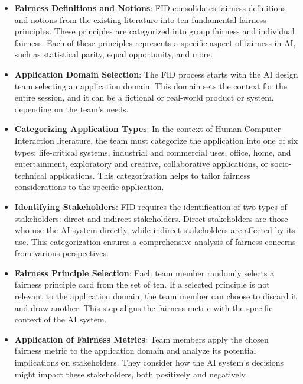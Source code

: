 \documentclass{article}
\begin{document}
\begin{itemize}
    \item \textbf{Fairness Definitions and Notions}: FID consolidates fairness definitions and notions from the existing literature into ten fundamental fairness principles. These principles are categorized into group fairness and individual fairness. Each of these principles represents a specific aspect of fairness in AI, such as statistical parity, equal opportunity, and more.
    
    \item \textbf{Application Domain Selection}: The FID process starts with the AI design team selecting an application domain. This domain sets the context for the entire session, and it can be a fictional or real-world product or system, depending on the team's needs.
    
    \item \textbf{Categorizing Application Types}: In the context of Human-Computer Interaction literature, the team must categorize the application into one of six types: life-critical systems, industrial and commercial uses, office, home, and entertainment, exploratory and creative, collaborative applications, or socio-technical applications. This categorization helps to tailor fairness considerations to the specific application.
    
    \item \textbf{Identifying Stakeholders}: FID requires the identification of two types of stakeholders: direct and indirect stakeholders. Direct stakeholders are those who use the AI system directly, while indirect stakeholders are affected by its use. This categorization ensures a comprehensive analysis of fairness concerns from various perspectives.
    
    \item \textbf{Fairness Principle Selection}: Each team member randomly selects a fairness principle card from the set of ten. If a selected principle is not relevant to the application domain, the team member can choose to discard it and draw another. This step aligns the fairness metric with the specific context of the AI system.
    
    \item \textbf{Application of Fairness Metrics}: Team members apply the chosen fairness metric to the application domain and analyze its potential implications on stakeholders. They consider how the AI system's decisions might impact these stakeholders, both positively and negatively.
    

\end{itemize}
\end{document}
